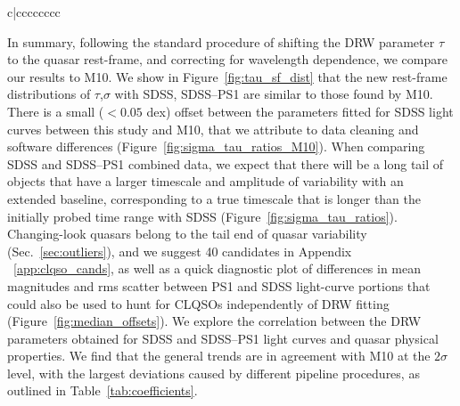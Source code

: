\documentclass[twocolumn]{aastex62}
\begin{document}
\begin{deluxetable*}{c|cccccccc}
\end{deluxetable*}


In summary, following the standard procedure of shifting the DRW parameter $\tau$ to the quasar rest-frame, and correcting for wavelength dependence, we compare our results to M10. We show in  Figure~\ref{fig:tau_sf_dist} that the new rest-frame distributions of $\tau$,$\sigma$ with SDSS, SDSS--PS1 are similar to those found by M10. There is a small ($<0.05$ dex) offset between the parameters fitted for SDSS light curves between this study and M10, that we attribute to data cleaning and software differences (Figure~\ref{fig:sigma_tau_ratios_M10}). When comparing SDSS and SDSS--PS1 combined data, we expect that there will be a long tail of objects that have a larger timescale and amplitude of variability with an extended baseline, corresponding to a true timescale that is longer than the initially probed time range with SDSS (Figure~\ref{fig:sigma_tau_ratios}). Changing-look quasars belong to the tail end of quasar variability (Sec.~\ref{sec:outliers}), and we suggest 40 candidates in Appendix ~\ref{app:clqso_cands}, as well as a quick diagnostic plot of differences in mean magnitudes and rms scatter between PS1 and SDSS light-curve portions that could also be used to hunt for CLQSOs independently of DRW fitting (Figure~\ref{fig:median_offsets}). We explore the correlation between the DRW parameters obtained for SDSS and SDSS--PS1 light curves and quasar physical properties. We find that the general trends are in agreement with M10 at the $2\sigma$ level, with the largest deviations caused by different pipeline procedures, as outlined in Table~\ref{tab:coefficients}.
\end{document}
